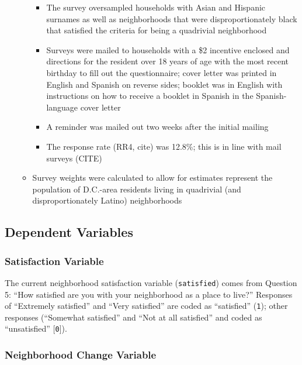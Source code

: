 \documentclass[]{article}
\providecommand{\tightlist}{%
  \setlength{\itemsep}{0pt}\setlength{\parskip}{0pt}}
\theoremstyle{definition}
\theoremstyle{definition}
\theoremstyle{definition}
\theoremstyle{remark}
\begin{document}
\begin{itemize}
\begin{itemize}
    \begin{itemize}
    \tightlist
    \item
      The survey oversampled households with Asian and Hispanic surnames
      as well as neighborhoods that were disproportionately black that
      satisfied the criteria for being a quadrivial neighborhood
    \item
      Surveys were mailed to households with a \$2 incentive enclosed
      and directions for the resident over 18 years of age with the most
      recent birthday to fill out the questionnaire; cover letter was
      printed in English and Spanish on reverse sides; booklet was in
      English with instructions on how to receive a booklet in Spanish
      in the Spanish-language cover letter
    \item
      A reminder was mailed out two weeks after the initial mailing
    \item
      The response rate (RR4, cite) was 12.8\%; this is in line with
      mail surveys (CITE)
    \end{itemize}
  \item
    Survey weights were calculated to allow for estimates represent the
    population of D.C.-area residents living in quadrivial (and
    disproportionately Latino) neighborhoods
  \end{itemize}
\end{itemize}

\subsection{Dependent Variables}\label{dependent-variables}

\subsubsection{Satisfaction Variable}\label{satisfaction-variable}

The current neighborhood satisfaction variable (\texttt{satisfied})
comes from Question 5: ``How satisfied are you with your neighborhood as
a place to live?'' Responses of ``Extremely satisfied'' and ``Very
satisfied'' are coded as ``satisfied'' (\texttt{1}); other responses
(``Somewhat satisfied'' and ``Not at all satisfied'' and coded as
``unsatisfied'' {[}\texttt{0}{]}).

\subsubsection{Neighborhood Change
Variable}\label{neighborhood-change-variable}
\end{document}
